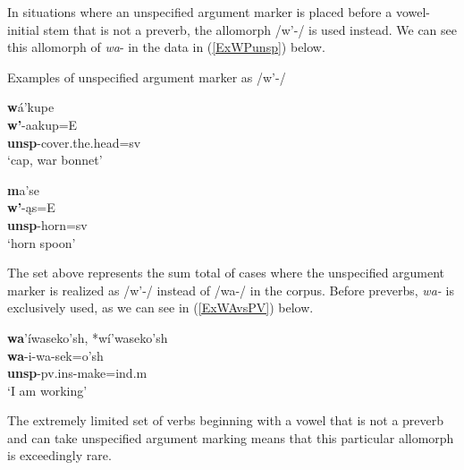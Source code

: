 \label{SubSecAllomorphw'}

In situations where an unspecified argument marker is placed before a vowel-initial stem that is not a preverb, the allomorph /w'-/ is used instead. We can see this allomorph of \textit{wa}- in the data in (\ref{ExWPunsp}) below.

\begin{exe}

\item\label{ExWPunsp} Examples of unspecified argument marker as /w'-/

	\begin{xlist}
	
	\item \glll \textbf{w}á'kupe\\
	\textbf{w'}-aakup=E\\
	\textbf{unsp}-\textnormal{cover.the.head}=sv\\
	\glt `cap, war bonnet' \citep[58]{hollow1970}
	
	\item \glll \textbf{m}a'se\\
	\textbf{w'}-ąs=E\\
	\textbf{unsp}-\textnormal{horn}=sv\\
	\glt `horn spoon' \citep[60]{hollow1970}

	\end{xlist}

\end{exe}

The set above represents the sum total of cases where the unspecified argument marker is realized as /w'-/ instead of /wa-/ in the corpus. Before preverbs, \textit{wa-} is exclusively used, as we can see in (\ref{ExWAvsPV}) below.

\begin{exe}

\item\label{ExWAvsPV} \glll \textbf{wa}'íwaseko'sh, *wí'waseko'sh\\
	\textbf{wa}-i-wa-sek=o'sh\\
	\textbf{unsp}-pv.ins-\textnormal{make}=ind.m\\
	\glt `I am working' \citep[203]{hollow1970}

\end{exe}

The extremely limited set of verbs beginning with a vowel that is not a preverb and can take unspecified argument marking means that this particular allomorph is exceedingly rare.

